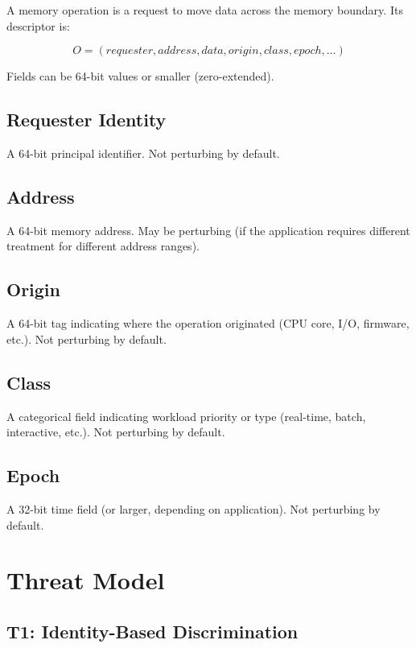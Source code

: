 \documentclass[11pt,oneside]{article}
\begin{document}
A memory operation is a request to move data across the memory boundary. Its descriptor is:

\[
O = (requester, address, data, origin, class, epoch, \ldots)
\]

Fields can be 64-bit values or smaller (zero-extended).

\subsection{Requester Identity}

A 64-bit principal identifier. Not perturbing by default.

\subsection{Address}

A 64-bit memory address. May be perturbing (if the application requires different treatment for different address ranges).

\subsection{Origin}

A 64-bit tag indicating where the operation originated (CPU core, I/O, firmware, etc.). Not perturbing by default.

\subsection{Class}

A categorical field indicating workload priority or type (real-time, batch, interactive, etc.). Not perturbing by default.

\subsection{Epoch}

A 32-bit time field (or larger, depending on application). Not perturbing by default.

\section{Threat Model}

\subsection{T1: Identity-Based Discrimination}
\end{document}
